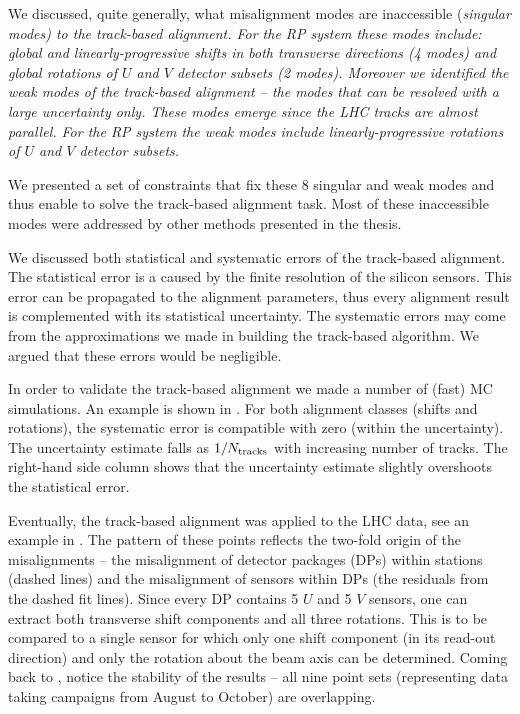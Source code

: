 We discussed, quite generally, what misalignment modes are inaccessible (\em{singular modes}) to the track-based alignment. For the RP system these modes include: global and linearly-progressive shifts in both transverse directions (4 modes) and global rotations of $U$ and $V$ detector subsets (2 modes). Moreover we identified the \em{weak modes} of the track-based alignment -- the modes that can be resolved with a large uncertainty only. These modes emerge since the LHC tracks are almost parallel. For the RP system the weak modes include linearly-progressive rotations of $U$ and $V$ detector subsets.

We presented a set of constraints that fix these 8 singular and weak modes and thus enable to solve the track-based alignment task. Most of these inaccessible modes were addressed by other methods presented in the thesis.

We discussed both statistical and systematic errors of the track-based alignment. The statistical error is a caused by the finite resolution of the silicon sensors. This error can be propagated to the alignment parameters, thus every alignment result is complemented with its statistical uncertainty. The systematic errors may come from the approximations we made in building the track-based algorithm. We argued that these errors would be negligible.

In order to validate the track-based alignment we made a number of (fast) MC simulations. An example is shown in . For both alignment classes (shifts and rotations), the systematic error is compatible with zero (within the uncertainty). The uncertainty estimate falls as $1/N_{\rm tracks}$ with increasing number of tracks. The right-hand side column shows that the uncertainty estimate slightly overshoots the statistical error.


Eventually, the track-based alignment was applied to the LHC data, see an example in . The pattern of these points reflects the two-fold origin of the misalignments -- the misalignment of detector packages (DPs) within stations (dashed lines) and the misalignment of sensors within DPs (the residuals from the dashed fit lines). Since every DP contains 5 $U$ and 5 $V$ sensors, one can extract both transverse shift components and all three rotations. This is to be compared to a single sensor for which only one shift component (in its read-out direction) and only the rotation about the beam axis can be determined. Coming back to , notice the stability of the results -- all nine point sets (representing data taking campaigns from August to October) are overlapping. 

